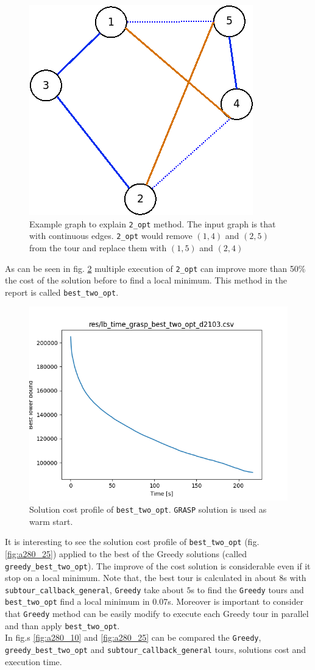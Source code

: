 \begin{figure}[h]
	\centering
	\includegraphics[width=.3\columnwidth]{img/2_opt_graph.png}
	\caption{Example graph to explain \texttt{2\_opt} method. The input graph is that with continuous edges. \texttt{2\_opt} would remove $ (1,4) $ and $ (2,5) $ from the tour and replace them with $ (1,5) $ and $  (2,4) $}
	\label{fig:2_opt_graph}
\end{figure}
As can be seen in fig. \ref{fig:lb_time_grasp_best_two_opt_d2103} multiple execution of \texttt{2\_opt} can improve more than 50\% the cost of the solution before to find a local minimum. This method in the report is called \texttt{best\_two\_opt}.
\begin{figure}[!h]
\centering
\includegraphics[width=.6\columnwidth]{../res/lb_time_grasp_best_two_opt_d2103.png}
\caption{Solution cost profile of \texttt{best\_two\_opt}. \texttt{GRASP} solution is used as warm start.}
\label{fig:lb_time_grasp_best_two_opt_d2103}
\end{figure}

It is interesting to see the solution cost profile of \texttt{best\_two\_opt} (fig. \ref{fig:a280_25}) applied to the best of the Greedy solutions (called \texttt{greedy\_best\_two\_opt}). The improve of the cost solution is considerable even if it stop on a local minimum.  Note that, the best tour is calculated in about $ 8 $s with \texttt{subtour\_callback\_general}, \texttt{Greedy} take about $ 5 $s to find the \texttt{Greedy} tours and \texttt{best\_two\_opt} find a local minimum in $0.07$s. Moreover is important to consider that \texttt{Greedy} method can be easily modify to execute each Greedy tour in parallel and than apply \texttt{best\_two\_opt}.\\
In fig.s \ref{fig:a280_10} and \ref{fig:a280_25} can be compared the \texttt{Greedy}, \texttt{greedy\_best\_two\_opt} and \texttt{subtour\_callback\_general} tours, solutions cost and execution time.\\

